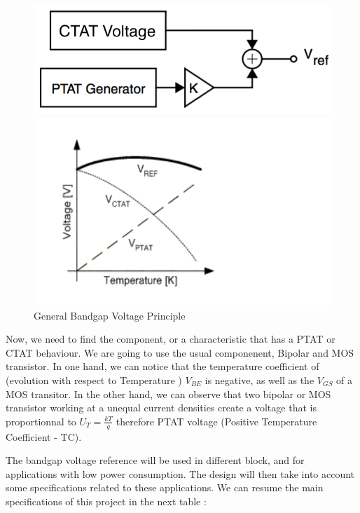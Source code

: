 \documentclass[11pt,a4paper]{report}
\begin{document}
\begin{figure}[h!]
   \begin{minipage}[b]{0.5\linewidth}
      \centering \includegraphics[scale=0.35]{photo/schema_principe}
   \end{minipage}\hfill
   \begin{minipage}[b]{0.5\linewidth}
      \centering \includegraphics[scale=0.4]{photo/sum_crb}
   \end{minipage}
   \caption{General Bandgap Voltage Principle}
   \label{Gene_bandgap}
\end{figure}

Now, we need to find the component, or a characteristic that has a PTAT or CTAT behaviour. We are going to use the usual componenent, Bipolar and MOS transistor. In one hand, we can notice that the temperature coefficient of (evolution with respect to Temperature ) $V_{BE}$ is negative, as well as the $V_{GS}$ of a MOS transitor. In the other hand, we can observe that two bipolar or MOS transistor working at a unequal current densities create a voltage that is proportionnal to $U_T = \frac{kT}{q}$ therefore PTAT voltage (Positive Temperature Coefficient - TC).

The bandgap voltage reference will be used in different block, and for applications with low power consumption. The design will then take into account some specifications related to these applications. We can resume the main specifications of this project in the next table :
\end{document}
